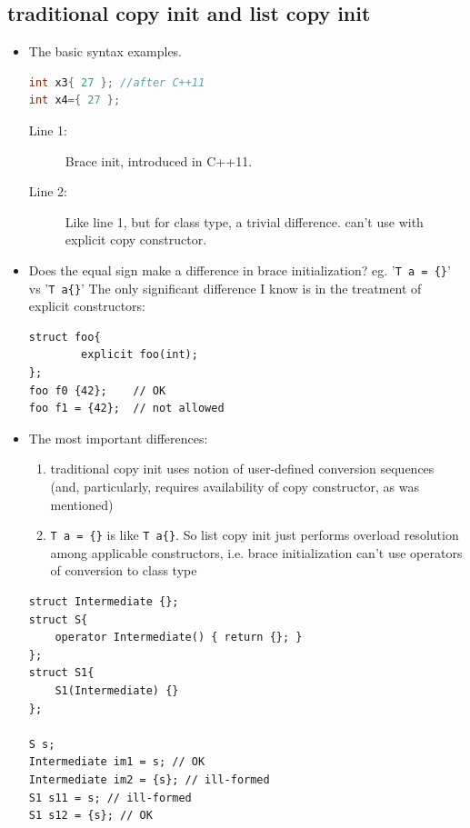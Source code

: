 \documentclass[a4paper,11pt,twoside]{book}
\begin{document}
\subsection{traditional copy init and list copy init}
\begin{itemize}
	\item The basic syntax examples. 
\begin{lstlisting}[frame=single, language=c++,mathescape=true]
int x3{ 27 }; //after C++11
int x4={ 27 }; 
\end{lstlisting}
	\begin{description}
		\item[Line 1:] Brace init, introduced in C++11.
		\item[Line 2:] Like line 1, but for class type, a trivial difference. can't use with explicit copy constructor.
	\end{description}

	\item Does the equal sign make a difference in brace initialization? eg. '\texttt{T a = \{\}}' vs '\texttt{T a\{\}}' The only significant difference I know is in the treatment of explicit constructors:
	
\begin{lstlisting}
struct foo{
		explicit foo(int);
};
foo f0 {42};    // OK
foo f1 = {42};  // not allowed
\end{lstlisting}

	
	\item The most important differences:
	\begin{enumerate}
		\item traditional copy init uses notion of user-defined conversion sequences (and, particularly, requires availability of copy constructor, as was mentioned)
		
		\item \texttt{T a = \{\}} is like \texttt{T a\{\}}. So list copy init just performs overload resolution among applicable constructors, i.e. brace initialization can't use operators of conversion to class type
	\end{enumerate}
\begin{lstlisting}
struct Intermediate {};
struct S{
	operator Intermediate() { return {}; }
};
struct S1{
	S1(Intermediate) {}
};
	
S s;
Intermediate im1 = s; // OK
Intermediate im2 = {s}; // ill-formed
S1 s11 = s; // ill-formed
S1 s12 = {s}; // OK
\end{lstlisting}
	

\end{itemize}
\end{document}
